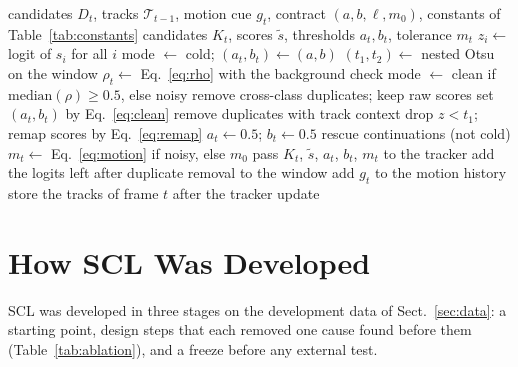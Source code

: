 \documentclass[pdflatex,sn-mathphys-num,iicol]{sn-jnl}
\newcommand{\scl}{SCL}
\begin{document}
\begin{algorithm}[t]
\caption{\scl{} for frame $t$; the comments name the steps of Fig.~\ref{fig:arch}. The window
holds the logits of frames $t-W$ to $t-1$, so the decision for frame $t$ uses no future frame.}\label{alg:layer}
\begin{algorithmic}[1]
\Require candidates $D_t$, tracks $\mathcal{T}_{t-1}$, motion cue $g_t$, contract $(a,b,\ell,m_0)$, constants of Table~\ref{tab:constants}
\Ensure candidates $K_t$, scores $\tilde{s}$, thresholds $a_t,b_t$, tolerance $m_t$
\State $z_i\gets$ logit of $s_i$ for all $i$ 
 
  \State mode $\gets$ cold; $(a_t,b_t)\gets(a,b)$
\Else
  \State $(t_1,t_2)\gets$ nested Otsu on the window 
  \State $\rho_t\gets$ Eq.~\eqref{eq:rho} with the background check
  \State mode $\gets$ clean if $\mathrm{median}(\rho)\ge0.5$, else noisy 
\EndIf
{} 
  \State remove cross-class duplicates; keep raw scores
   set $(a_t,b_t)$ by Eq.~\eqref{eq:clean}
  \EndIf
\Else {}
  \State remove duplicates with track context
  \State drop $z<t_1$; remap scores by Eq.~\eqref{eq:remap}
  \State $a_t\gets0.5$; $b_t\gets0.5$
\EndIf
\State rescue continuations (not cold) 
\State $m_t\gets$ Eq.~\eqref{eq:motion} if noisy, else $m_0$ 
\State pass $K_t$, $\tilde{s}$, $a_t$, $b_t$, $m_t$ to the tracker
\State add the logits left after duplicate removal to the window
\State add $g_t$ to the motion history
\State store the tracks of frame $t$ after the tracker update
\end{algorithmic}
\end{algorithm}
\section{How SCL Was Developed}\label{sec:development}

\scl{} was developed in three stages on the development data of Sect.~\ref{sec:data}: a starting
point, design steps that each removed one cause found before them (Table~\ref{tab:ablation}), and a
freeze before any external test.
\end{document}
